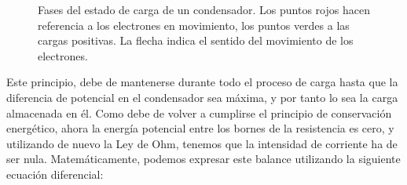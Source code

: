 \documentclass[../main.tex]{subfiles}
\begin{document}
\begin{figure}[!h]
    \centering
    \caption{Fases del estado de carga de un condensador. Los puntos rojos hacen referencia a los electrones en movimiento, los puntos verdes a las cargas positivas. La flecha indica el sentido del movimiento de los electrones.}
    \label{fig::carga_condensador}
\end{figure}


Este principio, debe de mantenerse durante todo el proceso de carga hasta que la diferencia de potencial en el condensador sea máxima, y por tanto lo sea la carga almacenada en él. Como debe de volver a cumplirse el principio de conservación energético, ahora la energía potencial entre los bornes de la resistencia es cero, y utilizando de nuevo la Ley de Ohm, tenemos que la intensidad de corriente ha de ser nula. Matemáticamente, podemos expresar este balance utilizando la siguiente ecuación diferencial:
\end{document}
